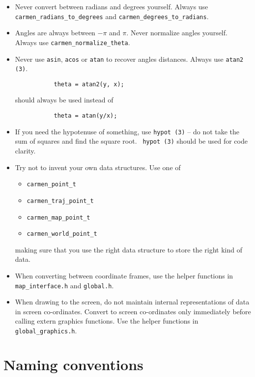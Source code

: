 \documentclass{article}
\begin{document}
\begin{itemize}
\item Never convert between radians and degrees yourself. Always use \\
\verb!carmen_radians_to_degrees! and \verb!carmen_degrees_to_radians!.

\item Angles are always between $-\pi$ and $\pi$. Never normalize angles
yourself. Always use \verb!carmen_normalize_theta!.

\item Never use \verb!asin!, \verb!acos! or \verb!atan! to recover angles
distances. Always use \verb!atan2 (3)!.
\begin{verbatim}
           theta = atan2(y, x);
\end{verbatim}
should always be used instead of 
\begin{verbatim}
           theta = atan(y/x);
\end{verbatim}

\item If you need the hypotenuse of something, use \verb!hypot (3)! -- do
not take the sum of squares and find the square root. \verb! hypot (3)! 
should be used for code clarity.

\item Try not to invent your own data structures. Use one of
  \begin{itemize}
  \item \verb!carmen_point_t!
  \item \verb!carmen_traj_point_t!
  \item \verb!carmen_map_point_t!
  \item \verb!carmen_world_point_t!
  \end{itemize}
  making sure that you use the right data structure to store the right kind of
  data.
  
\item When converting between coordinate frames, use the helper functions in
  \verb!map_interface.h! and \verb!global.h!.
  
\item When drawing to the screen, do not maintain internal representations of
  data in screen co-ordinates. Convert to screen co-ordinates only immediately
  before calling extern graphics functions. Use the helper functions in
  \verb!global_graphics.h!.

\end{itemize}

\section{Naming conventions}
\end{document}
